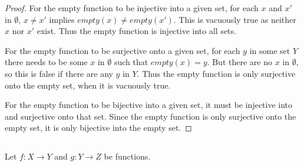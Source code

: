 \documentclass[../../main.tex]{subfiles}
\begin{document}
\begin{proof}
    For the empty function to be injective into a given set, for each $x$ and $x'$ in $\emptyset$, $x \neq x'$ implies $empty(x) \neq empty(x')$.
    This is vacuously true as neither $x$ nor $x'$ exist.
    Thus the empty function is injective into all sets.
    
    For the empty function to be surjective onto a given set, for each $y$ in some set $Y$ there needs to be some $x$ in $\emptyset$ such that $empty(x)=y$.
    But there are no $x$ in $\emptyset$, so this is false if there are any $y$ in $Y$.
    Thus the empty function is only surjective onto the empty set, when it is vacuously true.
    
    For the empty function to be bijective into a given set, it must be injective into and surjective onto that set. Since the empty function is only surjective onto the empty set, it is only bijective into the empty set.
\end{proof}

\subsection{}
\begin{q}
Let $f: X \to Y$ and $g: Y \to Z$ be functions.
\end{q}
\end{document}
